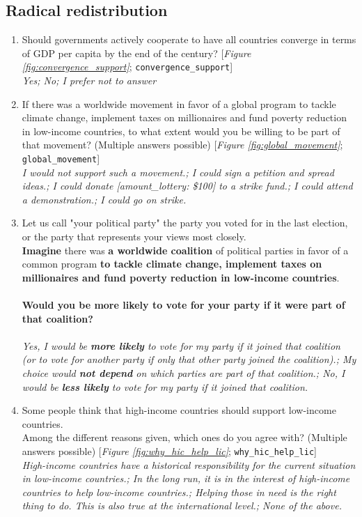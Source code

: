  \subsection*{Radical redistribution} 
 \begin{enumerate}[resume] 
\item  \label{q:convergence_support} Should governments actively cooperate to have all countries converge in terms of GDP per capita by the end of the century? [\textit{Figure \ref{fig:convergence_support}}; 
\verb|convergence_support|]
  \\ \textit{Yes; No; I prefer not to answer}

\item  \label{q:global_movement} If there was a worldwide movement in favor of a global program to tackle climate change, implement taxes on millionaires and fund poverty reduction in low-income countries, to what extent would you be willing to be part of that movement? (Multiple answers possible) [\textit{Figure \ref{fig:global_movement}}; 
\verb|global_movement|]
  \\ \textit{I would \textit{not} support such a movement.; I could sign a petition and spread ideas.; I could donate [amount\_lottery: \$100] to a strike fund.; I could attend a demonstration.; I could go on strike.}

\item  \label{q:vote_intl_coalition} Let us call "your political party" the party you voted for in the last election, or the party that represents your views most closely.\~\\\textbf{Imagine }there was \textbf{a worldwide coalition} of political parties in favor of a common program \textbf{to tackle climate change, implement taxes on millionaires and fund poverty reduction in low-income countries}.\~\\\\\textbf{Would you be more likely to vote for your party if it were part of that coalition?}\\ [\textit{Figure \ref{fig:vote_intl_coalition}}; 
\verb|vote_intl_coalition|]
  \\ \textit{Yes, I would be \textbf{more likely} to vote for my party if it joined that coalition (or to vote for another party if only that other party joined the coalition).; My choice would \textbf{not depend} on which parties are part of that coalition.; No, I would be \textbf{less likely} to vote for my party if it joined that coalition.}

\item  \label{q:why_hic_help_lic} Some people think that high-income countries should support low-income countries.\~\\Among the different reasons given, which ones do you agree with? (Multiple answers possible) [\textit{Figure \ref{fig:why_hic_help_lic}}; 
\verb|why_hic_help_lic|]
  \\ \textit{High-income countries have a historical responsibility for the current situation in low-income countries.; In the long run, it is in the interest of high-income countries to help low-income countries.; Helping those in need is the right thing to do. This is also true at the international level.; None of the above.}


\end{enumerate}
